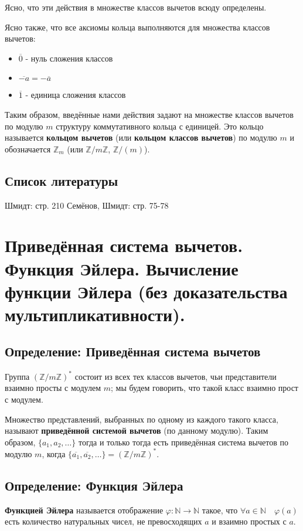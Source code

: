 \documentclass{article}
\begin{document}
Ясно, что эти действия в множестве классов вычетов всюду определены.

Ясно также, что все аксиомы кольца выполняются для множества классов вычетов:
\begin{itemize}
\item $\overline 0$ - нуль сложения классов
\item $\overline {-a} = - \overline a$
\item $\overline 1$ - единица сложения классов
\end{itemize}

Таким образом, введённые нами действия задают на множестве классов вычетов по модулю $m$ структуру коммутативного кольца с единицей. Это кольцо называется \textbf{кольцом вычетов} (или \textbf{кольцом классов вычетов}) по модулю $m$ и обозначается $\mathbb Z_m$ (или $\mathbb Z/m \mathbb Z$, $\mathbb Z/(m)$).

\subsection*{Список литературы}
Шмидт: стр. 210
Семёнов, Шмидт: стр. 75-78


\newpage
\section{Приведённая система вычетов. Функция Эйлера. Вычисление функции Эйлера (без доказательства мультипликативности).}
\subsection{Определение: Приведённая система вычетов}
Группа $(\mathbb Z/m \mathbb Z)^*$ состоит из всех тех классов вычетов, чьи представители взаимно просты с модулем $m$; мы будем говорить, что такой класс взаимно прост с модулем.

Множество представлений, выбранных по одному из каждого такого класса, называют \textbf{приведённой системой вычетов} (по данному модулю). Таким образом, $\{a_1, a_2, \dots \}$ тогда и только тогда есть приведённая система вычетов по модулю $m$, когда $\{\overline{a_1}, \overline{a_2}, \dots\} = (\mathbb Z/m \mathbb Z)^*$.

\subsection{Определение: Функция Эйлера}
\textbf{Функцией Эйлера} называется отображение $\varphi: \mathbb N \rightarrow \mathbb N$ такое, что $\forall a \in \mathbb N \quad \varphi(a)$ есть количество натуральных чисел, не превосходящих $a$ и взаимно простых с $a$.
\end{document}
